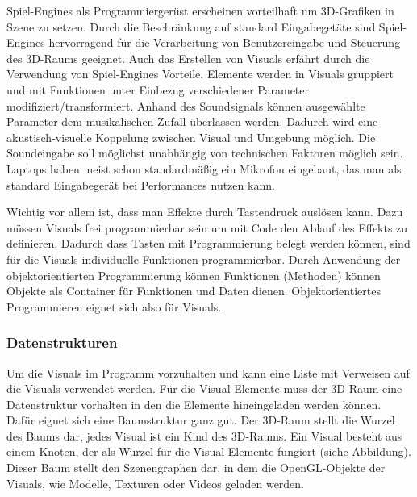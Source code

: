 Spiel-Engines als Programmierger\"ust erscheinen vorteilhaft um 3D-Grafiken in Szene zu setzen. Durch die Beschr\"ankung
auf standard Eingabeget\"ate sind Spiel-Engines hervorragend f\"ur die Verarbeitung von Benutzereingabe und Steuerung
des 3D-Raums geeignet. Auch das Erstellen von Visuals erf\"ahrt durch die Verwendung von Spiel-Engines Vorteile. Elemente
werden in Visuals gruppiert und mit Funktionen unter Einbezug verschiedener Parameter modifiziert/transformiert. Anhand
des Soundsignals k\"onnen ausgew\"ahlte Parameter dem musikalischen Zufall \"uberlassen werden. Dadurch wird eine 
akustisch-visuelle Koppelung zwischen Visual und Umgebung m\"oglich. Die Soundeingabe soll m\"oglichst unabh\"angig von
technischen Faktoren m\"oglich sein. Laptops haben meist schon standardm\"a\ss{}ig ein Mikrofon eingebaut, das man als
standard Eingabeger\"at bei Performances nutzen kann. 

Wichtig vor allem ist, dass man Effekte durch Tastendruck ausl\"osen kann. Dazu m\"ussen Visuals frei programmierbar sein
um mit Code den Ablauf des Effekts zu definieren. Dadurch dass Tasten mit Programmierung belegt werden k\"onnen, sind f\"ur
die Visuals individuelle Funktionen programmierbar. Durch Anwendung der objektorientierten Programmierung k\"onnen 
Funktionen (Methoden) k\"onnen Objekte als Container f\"ur Funktionen und Daten dienen. Objektorientiertes Programmieren
eignet sich also f\"ur Visuals.



\subsubsection{Datenstrukturen}

Um die Visuals im Programm vorzuhalten und kann eine Liste mit Verweisen auf die Visuals verwendet werden. F\"ur 
die Visual-Elemente muss der 3D-Raum eine Datenstruktur vorhalten in den die Elemente hineingeladen werden k\"onnen.
Daf\"ur eignet sich eine Baumstruktur ganz gut. Der 3D-Raum stellt die Wurzel des Baums dar, jedes Visual ist ein
Kind des 3D-Raums. Ein Visual besteht aus einem Knoten, der als Wurzel f\"ur die Visual-Elemente fungiert
(siehe Abbildung). Dieser Baum stellt den Szenengraphen dar, in dem die OpenGL-Objekte der Visuals, wie Modelle, Texturen 
oder Videos geladen werden.

